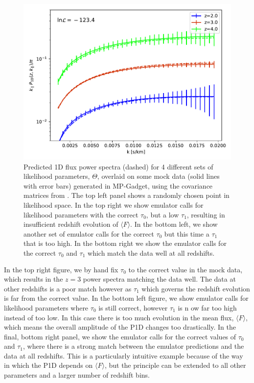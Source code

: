 \documentclass[]{article}
\begin{document}
\begin{figure}[h]
    \includegraphics[scale=0.4]{Figures/goodFit.pdf}
    \caption{Predicted 1D flux power spectra (dashed) for 4 different sets of likelihood
    parameters, $\Theta$, overlaid on some mock data (solid lines with error bars) generated
    in MP-Gadget, using the covariance matrices from \cite{PD2013}.
    The top left panel shows a randomly chosen point in likelihood space. In the top
    right we show emulator calls for likelihood parameters with the correct $\tau_0$,
    but a low $\tau_1$, resulting in insufficient redshift evolution of $\langle F\rangle$.
    In the bottom left, we show another set of emulator calls for the correct $\tau_0$
    but this time a $\tau_1$ that is too high. In the bottom right we show the emulator
    calls for the correct $\tau_0$ and $\tau_1$ which match the data well at all redshifts.}
\end{figure}

\noindent In the top right figure, we by hand fix $\tau_0$ to the correct value in the mock data, which results in the $z=3$ power spectra matching the data well.
The data at other redshifts is a poor match
however as $\tau_1$ which governs the redshift evolution is far from the correct value.
In the bottom left figure, we show emulator calls for likelihood parameters
where $\tau_0$ is still correct, however $\tau_1$ is n  ow far too high instead of too low.
In this case there is too much evolution in the mean flux, $\langle F\rangle$, which
means the overall amplitude of the P1D changes too drastically. In the final, bottom right
panel, we show the emulator calls for the correct values of $\tau_0$ and $\tau_1$, where
there is a strong match between the emulator predictions and the data at all redshifts.
This is a particularly intuitive example because of the way in which the P1D depends
on $\langle F\rangle$, but the principle can be extended to all other parameters and
a larger number of redshift bins.
\end{document}
